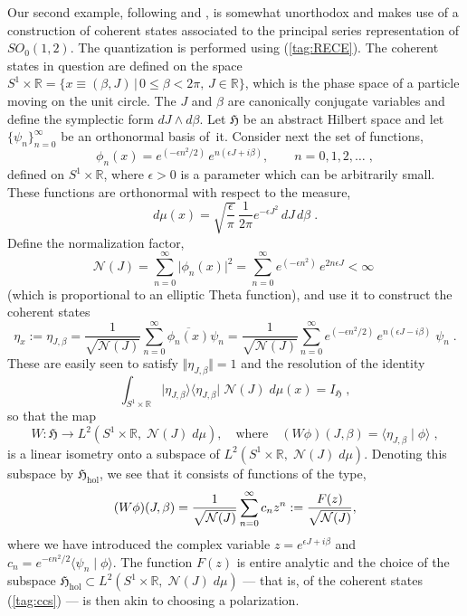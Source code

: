 \documentclass[12pt]{amsart}
\numberwithin{equation}{section}
\theoremstyle{remark}
\newcommand\HH{\mathfrak H}
\newcommand{\R}{\mathbb R}
\begin{document}
\medskip

Our second example, following \cite{bib:Gaz} and \cite{bib:GazP}, is somewhat
unorthodox and makes use of a construction of coherent states associated to the
principal series representation of $SO_0(1,2)$. The quantization is performed
using (\ref{tag:RECE}). The coherent states in question are defined on the
space $S^1 \times \mathbb R = \{ x \equiv (\beta,J) \, | \, 0 \leq \beta < 2\pi
, \, J \in \R \}$, which is the phase space of a particle moving on the unit
circle. The $J$ and $\beta$ are canonically conjugate variables and define the
symplectic form $dJ\wedge d\beta$. Let $\HH$ be an abstract Hilbert space and
let $\{\psi_n\}_{n=0}^\infty$ be an orthonormal basis of~it. Consider next the
set of functions,
\begin{equation}
  \phi_n (x) = e^{(-\epsilon n^2/2)} \,e^{n(\epsilon J +  i \beta)},
  \qquad n = 0,1,2, \ldots \;,
\label{tag:CS-fcns}
\end{equation}
defined on $S^1 \times \mathbb R$, where $\epsilon > 0$ is a parameter which
can be arbitrarily small. These functions are orthonormal with respect to the
measure,
$$
d\mu(x) = \sqrt{\frac{\epsilon}{\pi}}\,\frac{1}{2\pi}
e^{-\epsilon J^2} \, dJ\, d\beta \; .
$$
Define the normalization factor,
\begin{equation}
 \mathcal{N}(J) = \sum_{n=0}^\infty \vert\phi_n (x)\vert^2 =
\sum_{n=0}^\infty e^{(-\epsilon n^2)} \,e^{2n\epsilon J } < \infty\;
\label{tag:norci}
\end{equation}
(which is proportional to an elliptic Theta function), and use it to construct
the coherent states
\begin{equation}
\eta_x := \eta_{J, \beta} = \frac{1}{\sqrt{{\mathcal N} (J)}} \sum_{n=0}^\infty
    \overline{\phi_n (x)}\psi_n
 = \frac{1}{\sqrt{{\mathcal N} (J)}} \sum_{n=0}^\infty
    e^{(-\epsilon n^2/2)} \,e^{n(\epsilon J - i \beta)}\; \psi_n\; .
\label{tag:ccs}
\end{equation}
These are easily seen to satisfy $\Vert \eta_{J, \beta}\Vert = 1$ and the
resolution of the identity
\begin{equation}
 \int_{S^1\times \mathbb R}\vert \eta_{J,\beta} \rangle
 \langle \eta_{J, \beta} \vert\;
 \mathcal{N}(J)\;d\mu (x) = I_\HH \; ,
\label{tag:cylresolid}
\end{equation}
so that the map
$$ W:\HH \longrightarrow L^2 (S^1 \times \mathbb R , \; \mathcal N(J)\;d\mu ),
\quad \text{where} \quad
 (W\phi )(J, \beta ) = \langle \eta_{J,\beta} \mid \phi\rangle  \; , $$
is a linear isometry onto a subspace of $L^2 (S^1 \times \mathbb R , \;
\mathcal N (J) \;d\mu )$. Denoting this subspace by
$\HH_\text{hol}$, we see that it consists of functions of the type,
$$ (W\phi )(J, \beta ) = \frac1{\sqrt{\mathcal N(J)}} \sum_{n=0}^\infty c_n z^n
:= \frac{F(z)}{\sqrt{\mathcal N(J)}} , $$
where we have introduced the complex variable $z = e^{\epsilon J + i \beta}$
and $c_n = e^{-\epsilon n^2 /2}\langle \psi_n \mid \phi \rangle$. The function
$F(z)$ is entire analytic and the choice of the subspace $\HH_\text{hol}
\subset L^2 (S^1 \times \mathbb R , \; \mathcal N (J) \;d\mu )$ --- that is,
of the coherent states (\ref{tag:ccs}) --- is then akin to choosing a
polarization.
\end{document}
